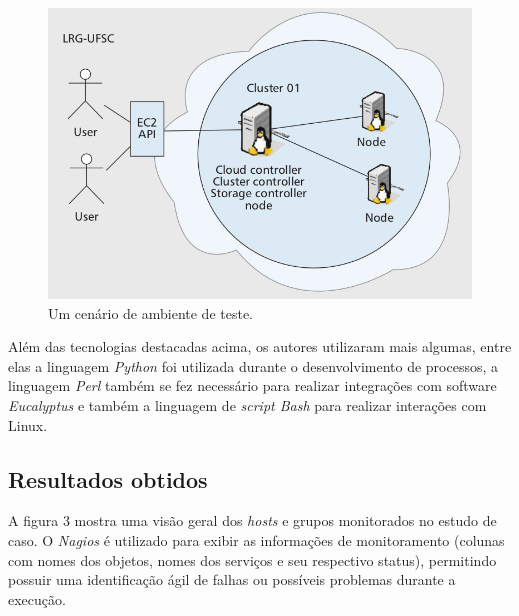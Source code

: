 \documentclass[12pt]{article}
\begin{document}
\begin{figure}[H]
    \includegraphics[width=\linewidth]{ambiente_teste.png}
    \caption{Um cenário de ambiente de teste.}
\end{figure}

Além das tecnologias destacadas acima, os autores utilizaram mais algumas, entre elas a linguagem \emph{Python} foi utilizada durante o desenvolvimento de processos, a linguagem \emph{Perl} também se fez necessário para realizar integrações com software \emph{Eucalyptus} e também a linguagem de \emph{script Bash} para realizar interações com Linux.

\subsection{Resultados obtidos}
A figura 3 mostra uma visão geral dos \emph{hosts} e grupos monitorados no estudo de caso. O \emph{Nagios} é utilizado para exibir as informações de monitoramento (colunas com nomes dos objetos, nomes dos serviços e seu respectivo status), permitindo possuir uma identificação ágil de falhas ou possíveis problemas durante a execução.
\end{document}
